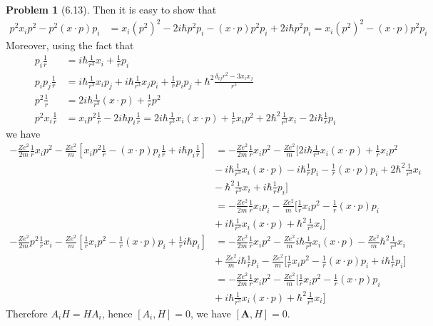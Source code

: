 \documentclass[twoside,11pt]{article}
\theoremstyle{definition}
\newtheorem{problem}{Problem}
\theoremstyle{remark}
\begin{document}
\begin{problem}[6.13]
Then it is easy to show that
\begin{align*}
    p^2x_ip^2 - p^2(x\cdot p)p_i &= 
    x_i(p^2)^2 - 2i\hbar p^2p_i 
    -(x\cdot p)p^2p_i + 2i\hbar p^2 p_i=
    x_i(p^2)^2 - (x\cdot p) p^2p_i
\end{align*}
Moreover, using the fact that
\begin{align*}
    p_i\frac{1}{r} &= i\hbar\frac{1}{r^3}x_i + \frac{1}{r}p_i\\
    p_ip_j\frac{1}{r} &= 
    i\hbar\frac{1}{r^3}x_ip_j + i\hbar\frac{1}{r^3}x_jp_i + 
    \frac{1}{r}p_ip_j + \hbar^2
    \frac{\delta_{ij}r^2 - 3x_ix_j}{r^5}\\
    p^2\frac{1}{r} &= 2i\hbar\frac{1}{r^3}(x\cdot p) + \frac{1}{r}p^2\\
    p^2x_i\frac{1}{r} &= x_ip^2\frac{1}{r} - 2i\hbar p_i\frac{1}{r}
    =2i\hbar\frac{1}{r^3}x_i(x\cdot p) + \frac{1}{r}x_ip^2
    +2\hbar^2\frac{1}{r^3}x_i - 2i\hbar\frac{1}{r}p_i
\end{align*}
we have
\begin{align*}
    -\frac{Ze^2}{2m}\frac{1}{r}x_ip^2 - 
    \frac{Ze^2}{m}[x_ip^2\frac{1}{r} - (x\cdot p)p_i\frac{1}{r}
    +i\hbar p_i\frac{1}{r}] &= 
    -\frac{Ze^2}{2m}\frac{1}{r}x_ip^2 - \frac{Ze^2}{m}\Big[
        2i\hbar\frac{1}{r^3}x_i(x\cdot p) + \frac{1}{r}x_ip^2\\
        &-\ i\hbar\frac{1}{r^3}x_i(x\cdot p) - i\hbar\frac{1}{r}p_i 
        - \frac{1}{r}(x\cdot p)p_i + 2\hbar^2\frac{1}{r^3}x_i\\
        &-\ \hbar^2\frac{1}{r^3}x_i + i\hbar\frac{1}{r}p_i
    \Big]\\
    &= -\frac{Ze^2}{2m}\frac{1}{r}x_ip_i - \frac{Ze^2}{m}\Big[
        \frac{1}{r}x_ip^2 - \frac{1}{r}(x\cdot p)p_i\\
    &+\ i\hbar\frac{1}{r^3}x_i(x\cdot p) + \hbar^2\frac{1}{r^3}x_i
    \Big]\\
    -\frac{Ze^2}{2m}p^2\frac{1}{r}x_i 
     - \frac{Ze^2}{m}[\frac{1}{r}x_ip^2 - \frac{1}{r}(x\cdot p)p_i + 
    \frac{1}{r}i\hbar p_i] &= 
    -\frac{Ze^2}{2m}\frac{1}{r}x_i p^2 - \frac{Ze^2}{m}i\hbar\frac{1}{r^3}x_i(x\cdot p)
    -\frac{Ze^2}{m}\hbar^2\frac{1}{r^3}x_i\\
    &+\ \frac{Ze^2}{m}i\hbar\frac{1}{r}p_i - \frac{Ze^2}{m}\Big[\frac{1}{r}x_ip^2 - \frac{1}{r}(x\cdot p)p_i + i\hbar\frac{1}{r}p_i\Big]\\
    &= -\frac{Ze^2}{2m}\frac{1}{r}x_ip^2 - \frac{Ze^2}{m}\Big[\frac{1}{r}x_ip^2 - \frac{1}{r}(x\cdot p)p_i\\
    &+\ i\hbar\frac{1}{r^3}x_i(x\cdot p) + \hbar^2\frac{1}{r^3}x_i\Big]
\end{align*}
Therefore $A_iH = HA_i$, hence $[A_i, H] = 0$, we have $[\mathbf{A}, H] = 0$.


\end{problem}
\end{document}
